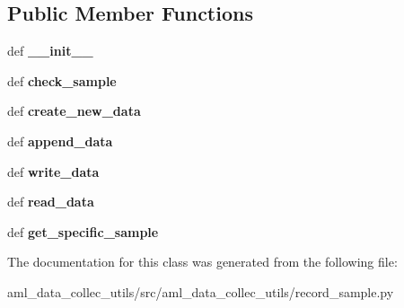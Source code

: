 \subsection*{Public Member Functions}
\begin{DoxyCompactItemize}
\item 
\hypertarget{classaml__data__collec__utils_1_1record__sample_1_1_data_manager_a966eab202c69988ff7ae109043cda6a9}{def {\bfseries \-\_\-\-\_\-init\-\_\-\-\_\-}}\label{classaml__data__collec__utils_1_1record__sample_1_1_data_manager_a966eab202c69988ff7ae109043cda6a9}

\item 
\hypertarget{classaml__data__collec__utils_1_1record__sample_1_1_data_manager_a1635586a623f54e627cbc38a6500e67b}{def {\bfseries check\-\_\-sample}}\label{classaml__data__collec__utils_1_1record__sample_1_1_data_manager_a1635586a623f54e627cbc38a6500e67b}

\item 
\hypertarget{classaml__data__collec__utils_1_1record__sample_1_1_data_manager_a409f6d441ea5b00171f42a04c2b64e93}{def {\bfseries create\-\_\-new\-\_\-data}}\label{classaml__data__collec__utils_1_1record__sample_1_1_data_manager_a409f6d441ea5b00171f42a04c2b64e93}

\item 
\hypertarget{classaml__data__collec__utils_1_1record__sample_1_1_data_manager_a6fbb84e06370cee2957c36a6182e4e91}{def {\bfseries append\-\_\-data}}\label{classaml__data__collec__utils_1_1record__sample_1_1_data_manager_a6fbb84e06370cee2957c36a6182e4e91}

\item 
\hypertarget{classaml__data__collec__utils_1_1record__sample_1_1_data_manager_ab46c74dad620a5484a08b88918c2c6aa}{def {\bfseries write\-\_\-data}}\label{classaml__data__collec__utils_1_1record__sample_1_1_data_manager_ab46c74dad620a5484a08b88918c2c6aa}

\item 
\hypertarget{classaml__data__collec__utils_1_1record__sample_1_1_data_manager_a7724d8a3d3df1b3c5a87620e005b5f96}{def {\bfseries read\-\_\-data}}\label{classaml__data__collec__utils_1_1record__sample_1_1_data_manager_a7724d8a3d3df1b3c5a87620e005b5f96}

\item 
\hypertarget{classaml__data__collec__utils_1_1record__sample_1_1_data_manager_a5770a65124b6e2c1e0f94fd2237e8d2d}{def {\bfseries get\-\_\-specific\-\_\-sample}}\label{classaml__data__collec__utils_1_1record__sample_1_1_data_manager_a5770a65124b6e2c1e0f94fd2237e8d2d}

\end{DoxyCompactItemize}


The documentation for this class was generated from the following file\-:\begin{DoxyCompactItemize}
\item 
aml\-\_\-data\-\_\-collec\-\_\-utils/src/aml\-\_\-data\-\_\-collec\-\_\-utils/record\-\_\-sample.\-py\end{DoxyCompactItemize}
